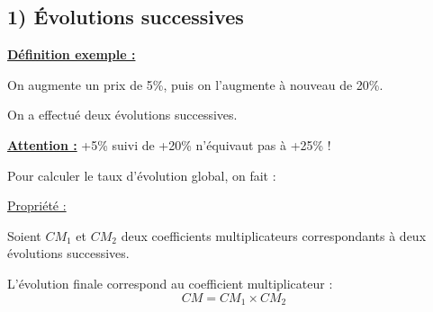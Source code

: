 \documentclass[12pt]{article}
\begin{document}
\subsection*{\hspace{1cm} 1) Évolutions successives}

\vspace{5pt}
\underline{{\color{ForestGreen}\bf{Définition exemple :}}}

\vspace{5pt}
On augmente un prix de 5\%, puis on l’augmente à nouveau de 20\%.

On a effectué deux
évolutions successives.

\vspace{5pt}
\textbf{{\color{red}\underline{Attention :}}} +5\% suivi de +20\% n’équivaut pas à +25\% !

\vspace{5pt}
Pour calculer le taux d’évolution global, on fait :

\vspace{10pt}

\vspace{0.5cm}
{\color{black!30}\dotfill}

\newpage
\begin{mdframed}[
    linewidth=1pt,
    roundcorner=5pt,
    linecolor=Red,
    innertopmargin=10pt,
    innerbottommargin=0pt
]
{\color{red}
\underline{Propriété :}

\vspace{5pt}
Soient $CM_1$ et $CM_2$ deux coefficients multiplicateurs correspondants à deux évolutions
successives.

L'évolution finale correspond au coefficient multiplicateur : 
\[
CM = CM_1 \times CM_2
\]
}
\end{mdframed}
\end{document}
